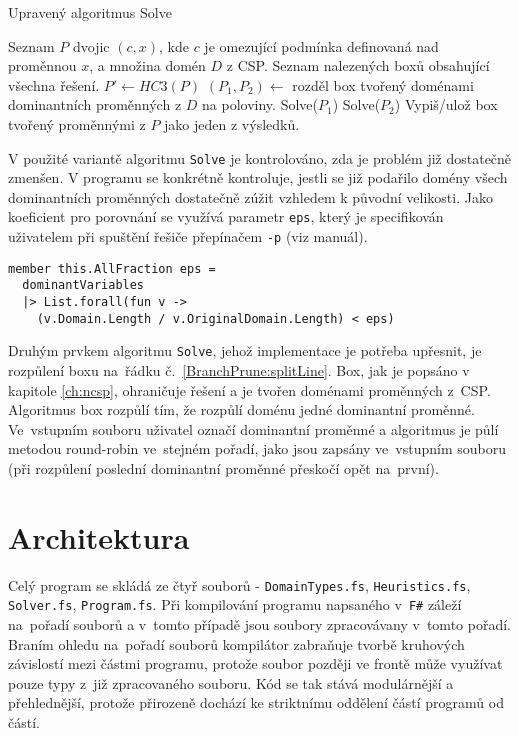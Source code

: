 \begin{algorithm}
\caption{Upravený algoritmus Solve}
\label{BranchPrune}
\begin{algorithmic}[1]
\Require Seznam $P$ dvojic $(c, x)$, kde $c$ je omezující podmínka definovaná nad proměnnou $x$, a množina domén $D$ z CSP.
\Ensure Seznam nalezených boxů obsahující všechna řešení.
\State $P' \gets HC3(P)$
\State $(P_1, P_2) \gets $ rozděl box tvořený doménami dominantních proměnných z $D$ na poloviny. \label{BranchPrune:splitLine}
\State Solve($P_1$)
\State Solve($P_2$)
\Else
\State Vypiš/ulož box tvořený proměnnými z $P$ jako jeden z výsledků.
\EndIf
\EndProcedure
\end{algorithmic}
\end{algorithm}

V použité variantě algoritmu \verb|Solve| je kontrolováno, zda je problém již dostatečně zmenšen. V programu se konkrétně kontroluje, jestli se již podařilo domény všech dominantních proměnných dostatečně zúžit vzhledem k původní velikosti. Jako koeficient pro porovnání se využívá parametr \verb|eps|, který je specifikován uživatelem při spuštění řešiče přepínačem \verb|-p| (viz manuál).

\begin{Verbatim}[samepage=true]
member this.AllFraction eps =
  dominantVariables 
  |> List.forall(fun v -> 
    (v.Domain.Length / v.OriginalDomain.Length) < eps)
\end{Verbatim}


Druhým prvkem algoritmu \verb|Solve|, jehož implementace je potřeba upřesnit, je rozpůlení boxu na~řádku č.~\ref{BranchPrune:splitLine}. Box, jak je popsáno v kapitole \ref{ch:ncsp}, ohraničuje řešení a je tvořen doménami proměnných z~CSP. Algoritmus box rozpůlí tím, že rozpůlí doménu jedné dominantní proměnné. Ve~vstupním souboru uživatel označí dominantní proměnné a algoritmus je půlí metodou round-robin ve~stejném pořadí, jako jsou zapsány ve~vstupním souboru (při rozpůlení poslední dominantní proměnné přeskočí opět na~první).


\section{Architektura}
Celý program se skládá ze čtyř souborů - \verb|DomainTypes.fs|, \verb|Heuristics.fs|, \verb|Solver.fs|, \verb|Program.fs|. Při kompilování programu napsaného v~\texttt{F\#} záleží na~pořadí souborů a v~tomto případě jsou soubory zpracovávany v~tomto pořadí. Braním ohledu na~pořadí souborů kompilátor zabraňuje tvorbě kruhových závislostí mezi částmi programu, protože soubor později ve frontě může využívat pouze typy z~již zpracovaného souboru. Kód se tak stává modulárnější a přehlednější, protože přirozeně dochází ke striktnímu oddělení  částí programů od  částí.

